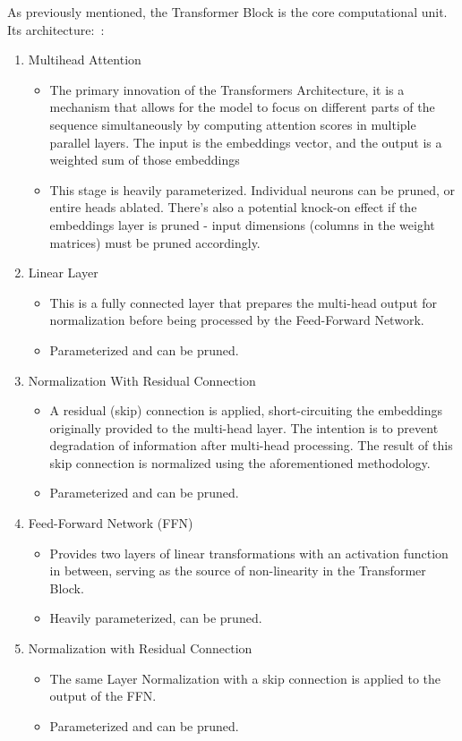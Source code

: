 \documentclass{article}
\begin{document}
    As previously mentioned, the Transformer Block is the core computational unit.
    Its architecture:~\cite{chalvatzaki2023learningreasonscenegraphs}:
    \begin{enumerate}
        \item Multihead Attention
        \begin{itemize}
            \item The primary innovation of the Transformers Architecture, it is a mechanism that allows for the model to focus on different parts of the sequence simultaneously by computing attention scores in multiple parallel layers.
            The input is the embeddings vector, and the output is a weighted sum of those embeddings
            \item This stage is heavily parameterized.
            Individual neurons can be pruned, or entire heads ablated.
            There's also a potential knock-on effect if the embeddings layer is pruned - input dimensions (columns in the weight matrices) must be pruned accordingly.
        \end{itemize}
        \item Linear Layer
        \begin{itemize}
            \item This is a fully connected layer that prepares the multi-head output for normalization before being processed by the Feed-Forward Network.
            \item Parameterized and can be pruned.
        \end{itemize}
        \item Normalization With Residual Connection
        \begin{itemize}
            \item A residual (skip) connection is applied, short-circuiting the embeddings originally provided to the multi-head layer.
            The intention is to prevent degradation of information after multi-head processing.
            The result of this skip connection is normalized using the aforementioned methodology.
            \item Parameterized and can be pruned.
        \end{itemize}
        \item Feed-Forward Network (FFN)
        \begin{itemize}
            \item Provides two layers of linear transformations with an activation function in between, serving as the source of non-linearity in the Transformer Block.
            \item Heavily parameterized, can be pruned.
        \end{itemize}
        \item Normalization with Residual Connection
        \begin{itemize}
            \item The same Layer Normalization with a skip connection is applied to the output of the FFN.
            \item Parameterized and can be pruned.
        \end{itemize}
    \end{enumerate}
\end{document}
